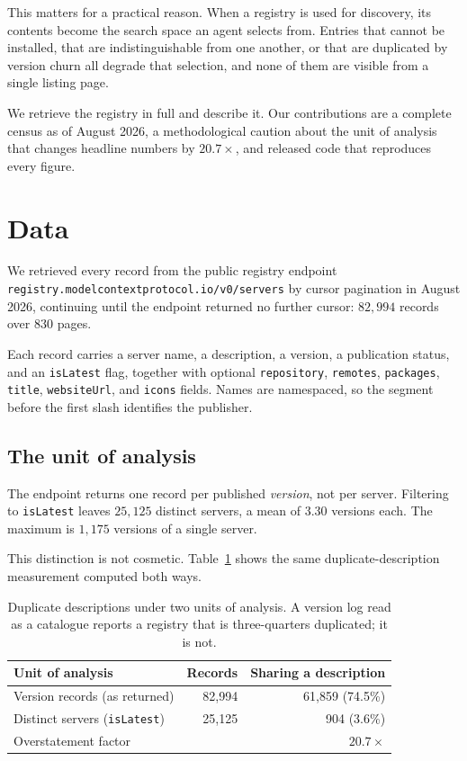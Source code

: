 \documentclass[11pt]{article}
\begin{document}
This matters for a practical reason. When a registry is used for discovery, its
contents become the search space an agent selects from. Entries that cannot be
installed, that are indistinguishable from one another, or that are duplicated
by version churn all degrade that selection, and none of them are visible from
a single listing page.

We retrieve the registry in full and describe it. Our contributions are a
complete census as of August 2026, a methodological caution about the unit of
analysis that changes headline numbers by $20.7\times$, and released code that
reproduces every figure.

\section{Data}

We retrieved every record from the public registry endpoint
\texttt{registry.modelcontextprotocol.io/v0/servers} by cursor pagination in
August 2026, continuing until the endpoint returned no further cursor:
$82{,}994$ records over $830$ pages.

Each record carries a server name, a description, a version, a publication
status, and an \texttt{isLatest} flag, together with optional
\texttt{repository}, \texttt{remotes}, \texttt{packages}, \texttt{title},
\texttt{websiteUrl}, and \texttt{icons} fields. Names are namespaced, so the
segment before the first slash identifies the publisher.

\subsection{The unit of analysis}

The endpoint returns one record per published \emph{version}, not per server.
Filtering to \texttt{isLatest} leaves $25{,}125$ distinct servers, a mean of
$3.30$ versions each. The maximum is $1{,}175$ versions of a single server.

This distinction is not cosmetic. Table~\ref{tab:unit} shows the same
duplicate-description measurement computed both ways.

\begin{table}[h]
\centering
\small
\begin{tabular}{lrr}
\toprule
Unit of analysis & Records & Sharing a description \\
\midrule
Version records (as returned) & 82{,}994 & 61{,}859 \quad (74.5\%) \\
Distinct servers (\texttt{isLatest}) & 25{,}125 & 904 \quad (3.6\%) \\
\midrule
\multicolumn{2}{l}{Overstatement factor} & $\mathbf{20.7\times}$ \\
\bottomrule
\end{tabular}
\caption{Duplicate descriptions under two units of analysis. A version log read
as a catalogue reports a registry that is three-quarters duplicated; it is not.}
\label{tab:unit}
\end{table}
\end{document}
